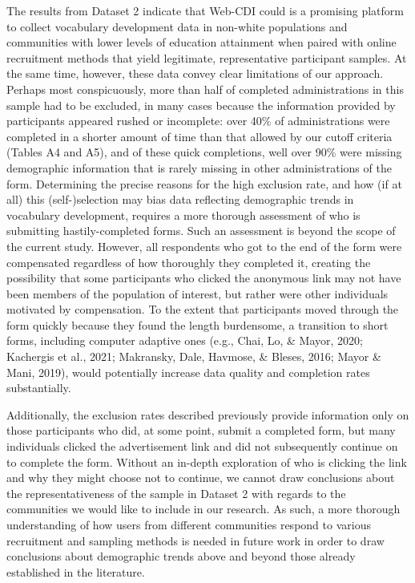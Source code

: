 \documentclass[
  english,
  ,man,floatsintext]{apa6}
\begin{document}
The results from Dataset 2 indicate that Web-CDI could is a promising platform to collect vocabulary development data in non-white populations and communities with lower levels of education attainment when paired with online recruitment methods that yield legitimate, representative participant samples. At the same time, however, these data convey clear limitations of our approach. Perhaps most conspicuously, more than half of completed administrations in this sample had to be excluded, in many cases because the information provided by participants appeared rushed or incomplete: over 40\% of administrations were completed in a shorter amount of time than that allowed by our cutoff criteria (Tables A4 and A5), and of these quick completions, well over 90\% were missing demographic information that is rarely missing in other administrations of the form. Determining the precise reasons for the high exclusion rate, and how (if at all) this (self-)selection may bias data reflecting demographic trends in vocabulary development, requires a more thorough assessment of who is submitting hastily-completed forms. Such an assessment is beyond the scope of the current study. However, all respondents who got to the end of the form were compensated regardless of how thoroughly they completed it, creating the possibility that some participants who clicked the anonymous link may not have been members of the population of interest, but rather were other individuals motivated by compensation. To the extent that participants moved through the form quickly because they found the length burdensome, a transition to short forms, including computer adaptive ones (e.g., Chai, Lo, \& Mayor, 2020; Kachergis et al., 2021; Makransky, Dale, Havmose, \& Bleses, 2016; Mayor \& Mani, 2019), would potentially increase data quality and completion rates substantially.

Additionally, the exclusion rates described previously provide information only on those participants who did, at some point, submit a completed form, but many individuals clicked the advertisement link and did not subsequently continue on to complete the form. Without an in-depth exploration of who is clicking the link and why they might choose not to continue, we cannot draw conclusions about the representativeness of the sample in Dataset 2 with regards to the communities we would like to include in our research. As such, a more thorough understanding of how users from different communities respond to various recruitment and sampling methods is needed in future work in order to draw conclusions about demographic trends above and beyond those already established in the literature.
\end{document}
